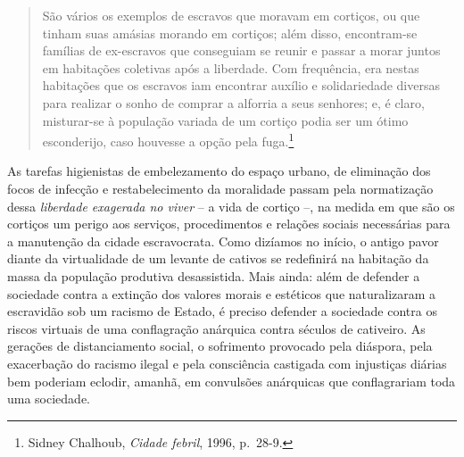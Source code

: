 \begin{quote}
São vários os exemplos de escravos que moravam em cortiços, ou que
tinham suas amásias morando em cortiços; além disso, encontram-se
famílias de ex-escravos que conseguiam se reunir e passar a morar juntos
em habitações coletivas após a liberdade. Com frequência, era nestas
habitações que os escravos iam encontrar auxílio e solidariedade
diversas para realizar o sonho de comprar a alforria a seus senhores; e,
é claro, misturar-se à população variada de um cortiço podia ser um
ótimo esconderijo, caso houvesse a opção pela fuga.\footnote{Sidney
  Chalhoub, \emph{Cidade febril}, 1996, p.~28-9.}
\end{quote}

As tarefas higienistas de embelezamento do espaço urbano, de eliminação
dos focos de infecção e restabelecimento da moralidade passam pela
normatização dessa \emph{liberdade exagerada no viver} -- a vida de
cortiço --, na medida em que são os cortiços um perigo aos serviços,
procedimentos e relações sociais necessárias para a manutenção da cidade
escravocrata. Como dizíamos no início, o antigo pavor diante da
virtualidade de um levante de cativos se redefinirá na habitação da
massa da população produtiva desassistida. Mais ainda: além de defender
a sociedade contra a extinção dos valores morais e estéticos que
naturalizaram a escravidão sob um racismo de Estado, é preciso defender
a sociedade contra os riscos virtuais de uma conflagração anárquica
contra séculos de cativeiro. As gerações de distanciamento social, o
sofrimento provocado pela diáspora, pela exacerbação do racismo ilegal e
pela consciência castigada com injustiças diárias bem poderiam eclodir,
amanhã, em convulsões anárquicas que conflagrariam toda uma sociedade.

